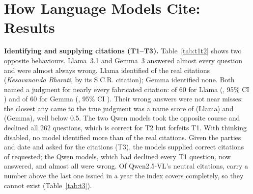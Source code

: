 \documentclass[conference]{IEEEtran}
\begin{document}
\section{How Language Models Cite: Results}
\label{sec:results}
\textbf{Identifying and supplying citations (T1--T3).} Table~\ref{tab:t1t2} shows two opposite behaviours. Llama~3.1 and Gemma~3 answered almost every question and were almost always wrong. Llama identified \TOneCorrectLlama{} of the \TOneN{} real citations (\emph{Kesavananda Bharati}, by its S.C.R. citation); Gemma identified none. Both named a judgment for nearly every fabricated citation: \TTwoNamedLlama{} of 60 for Llama (\TTwoNamedPctLlama, 95\% CI \TTwoNamedCILlama) and \TTwoNamedGemma{} of 60 for Gemma (\TTwoNamedPctGemma, 95\% CI \TTwoNamedCIGemma). Their wrong answers were not near misses: the closest any came to the true judgment was a name score of \MaxWrongLenientLlama{} (Llama) and \MaxWrongLenientGemma{} (Gemma), well below 0.5. The two Qwen models took the opposite course and declined all 262 questions, which is correct for T2 but forfeits T1. With thinking disabled, no model identified more than \BestTOneCorrect{} of the \TOneN{} real citations. Given the parties and date and asked for the citations (T3), the models supplied \TThreeCorrectAll{} correct citations of \TThreeAskedAll{} requested; the Qwen models, which had declined every T1 question, now answered, and almost all were wrong. Of Qwen2.5-VL's neutral citations, \TThreeUnassignedQwenVL{} carry a number above the last one issued in a year the index covers completely, so they cannot exist (Table~\ref{tab:t3}).

\begin{table}[t]
\caption{Supplying the citations of \NumTThree{} known judgments, given parties and decision date. Corr.\ = exact match; Wrong = any other non-empty answer; Empty = no citation given.}
\label{tab:t3}
\centering
\setlength{\tabcolsep}{4pt}

\end{table}

\begin{table}[t]
\caption{Identifying a judgment from its citation. T1: \NumTOne{} real citations (\NumJudgments{} judgments, each by S.C.R. and neutral citation). T2: \NumTTwo{} citations that cannot exist. Corr.\ = named the right judgment; Named = named any judgment for a fabricated citation; Decl.\ = declined; Inv.\ = invalid output.}
\label{tab:t1t2}
\centering
\footnotesize
\setlength{\tabcolsep}{3pt}

\end{table}
\end{document}
